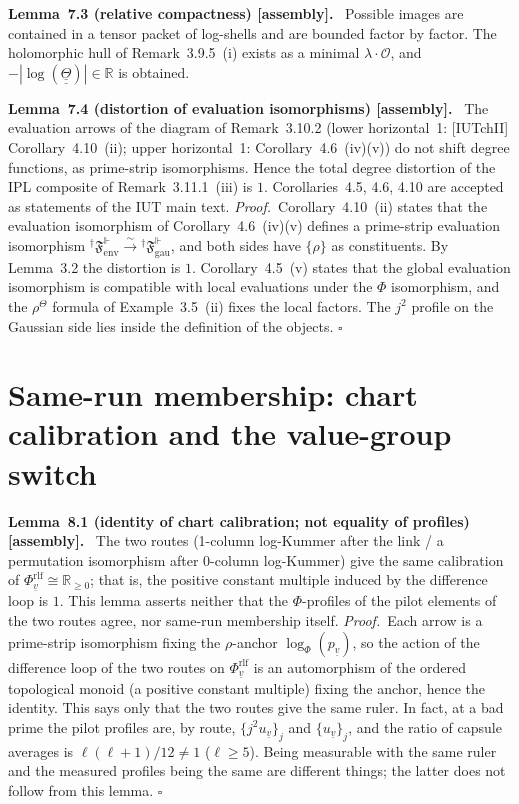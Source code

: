 \documentclass[11pt]{article}
\newcommand{\cO}{\mathcal O}
\newcommand{\uu}[1]{\underline{\underline{#1}}}
\newcommand{\stmt}[2]{\medskip\noindent\textbf{#1\ #2.}\ }
\newcommand{\pf}{\medskip\noindent\textit{Proof.}\ }
\newcommand{\qedh}{\hfill\(\square\)\par\medskip}
\begin{document}
\stmt{Lemma}{7.3 (relative compactness) [assembly]}
Possible images are contained in a tensor packet of log-shells and
are bounded factor by factor.  The holomorphic hull of
Remark~3.9.5~(i) exists as a minimal $\lambda\cdot\cO$, and
$-|\log(\uu\Theta)|\in\mathbb R$ is obtained.

\stmt{Lemma}{7.4 (distortion of evaluation isomorphisms) [assembly]}
The evaluation arrows of the diagram of Remark~3.10.2 (lower
horizontal~1: [IUTchII] Corollary~4.10~(ii); upper horizontal~1:
Corollary~4.6~(iv)(v)) do not shift degree functions, as
prime-strip isomorphisms.  Hence the total degree distortion of the
IPL composite of Remark~3.11.1~(iii) is $1$.  Corollaries~4.5, 4.6,
4.10 are accepted as statements of the IUT main text.
\pf Corollary~4.10~(ii) states that the evaluation isomorphism of
Corollary~4.6~(iv)(v) defines a prime-strip evaluation isomorphism
${}^{†}\mathfrak F_{\mathrm{env}}^{\Vdash}\xrightarrow{\sim}
{}^{†}\mathfrak F_{\mathrm{gau}}^{\Vdash}$, and both sides have
$\{\rho\}$ as constituents.  By Lemma~3.2 the distortion is $1$.
Corollary~4.5~(v) states that the global evaluation isomorphism is
compatible with local evaluations under the $\Phi$ isomorphism, and
the $\rho^{\Theta}$ formula of Example~3.5~(ii) fixes the local
factors.  The $j^2$ profile on the Gaussian side lies inside the
definition of the objects. \qedh

\section{Same-run membership: chart calibration and the value-group switch}

\stmt{Lemma}{8.1 (identity of chart calibration; not equality of profiles) [assembly]}
The two routes (1-column log-Kummer after the link / a permutation
isomorphism after 0-column log-Kummer) give the same calibration of
$\Phi^{\mathrm{rlf}}_{\underline v}\cong\mathbb R_{\ge0}$; that is,
the positive constant multiple induced by the difference loop is
$1$.  This lemma asserts neither that the $\Phi$-profiles of the
pilot elements of the two routes agree, nor same-run membership
itself.
\pf Each arrow is a prime-strip isomorphism fixing the $\rho$-anchor
$\log_{\Phi}(p_{\underline v})$, so the action of the difference
loop of the two routes on $\Phi^{\mathrm{rlf}}_{\underline v}$ is an
automorphism of the ordered topological monoid (a positive constant
multiple) fixing the anchor, hence the identity.  This says only
that the two routes give the same ruler.  In fact, at a bad prime
the pilot profiles are, by route, $\{j^2u_{\underline v}\}_j$ and
$\{u_{\underline v}\}_j$, and the ratio of capsule averages is
$\ell(\ell+1)/12\ne1$ ($\ell\ge5$).  Being measurable with the same
ruler and the measured profiles being the same are different
things; the latter does not follow from this lemma. \qedh
\end{document}
